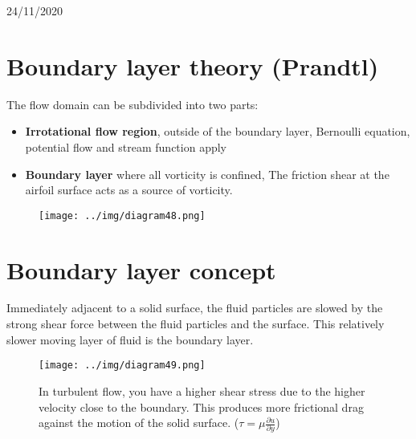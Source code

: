 \documentclass[class=report, crop=false, 12pt,a4paper]{standalone}
\begin{document}
\begin{center}
    24/11/2020
\end{center}
\section*{Boundary layer theory (Prandtl)}
The flow domain can be subdivided into two parts:
\begin{itemize}
  \item \textbf{Irrotational flow region}, outside of the boundary layer, Bernoulli equation, potential flow and stream function apply
  \item \textbf{Boundary layer} where all vorticity is confined, The friction shear at the airfoil surface acts as a source of vorticity. 
\end{itemize}
\begin{figure}[H]
  \centering
  \texttt{[image: ../img/diagram48.png]}
\end{figure}
\section{Boundary layer concept}
Immediately adjacent to a solid surface, the fluid particles are slowed by the strong shear force between the fluid particles and the surface. This relatively slower moving layer of fluid is the boundary layer.
\begin{figure}[H]
  \centering
  \texttt{[image: ../img/diagram49.png]}
  \caption{In turbulent flow, you have a higher shear stress due to the higher velocity close to the boundary. This produces more frictional drag against the motion of the solid surface. ($\tau = \mu \frac{\partial u}{\partial y}$)}
\end{figure}
\end{document}
